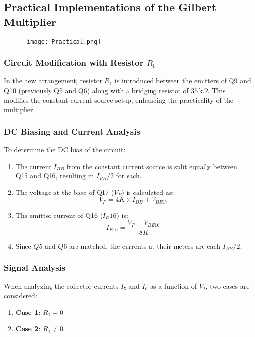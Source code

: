 \documentclass[a4paper,9pt,twoside,openany,twocolumn]{memoir}
\begin{document}
\subsection{Practical Implementations of the Gilbert Multiplier}
\begin{figure}[h]
    \centering
    \texttt{[image: Practical.png]} %
    \caption{}
    \label{fig:Practical}
\end{figure}
\subsubsection{Circuit Modification with Resistor $R_1$}

In the new arrangement, resistor $R_1$ is introduced between the emitters of Q9 and Q10 (previously Q5 and Q6) along with a bridging resistor of $35\,\text{k}\Omega$. This modifies the constant current source setup, enhancing the practicality of the multiplier.

\subsubsection{DC Biasing and Current Analysis}

To determine the DC bias of the circuit:
\begin{enumerate}
    \item The current $I_{BB}$ from the constant current source is split equally between Q15 and Q16, resulting in $I_{BB}/2$ for each.
    \item The voltage at the base of Q17 ($V_P$) is calculated as:
    \[
    V_P = 4K \times I_{BB} + V_{BE17}
    \]
    \item The emitter current of Q16 ($I_E16$) is:
    \[
    I_{E16} = \frac{V_P - V_{BE16}}{8K}
    \]
    \item Since $Q5$ and $Q6$ are matched, the currents at their meters are each $I_{BB}/2$.
\end{enumerate}

\subsubsection{Signal Analysis}

When analyzing the collector currents $I_5$ and $I_6$ as a function of $V_2$, two cases are considered:
\begin{enumerate}
    \item \textbf{Case 1}: $R_1 = 0$
    \item \textbf{Case 2}: $R_1 \neq 0$
\end{enumerate}
\end{document}
